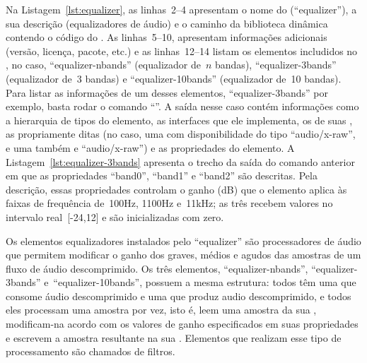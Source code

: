 \documentclass{SBCbookchapter}
\begin{document}


Na Listagem~\ref{lst:equalizer}, as linhas~2--4 apresentam o nome do
 (``equalizer''), a sua descrição (equalizadores de áudio) e o
caminho da biblioteca dinâmica contendo o código do .  As
linhas~5--10, apresentam informações adicionais (versão, licença, pacote,
etc.) e as linhas~12--14 listam os elementos includidos no , no
caso, ``equalizer-nbands'' (equalizador de~$n$ bandas), ``equalizer-3bands''
(equalizador de~3 bandas) e ``equalizer-10bands'' (equalizador de~10
bandas).  Para listar as informações de um desses elementos,
``equalizer-3bands'' por exemplo, basta rodar o comando
``''.  A saída nesse caso contém
informações como a hierarquia de tipos do elemento, as interfaces que ele
implementa, os  de suas , as  propriamente
ditas (no caso, uma  com disponibilidade  do tipo
``audio/x-raw'', e uma  também  e ``audio/x-raw'') e
as propriedades do elemento.  A Listagem~\ref{lst:equalizer-3bands}
apresenta o trecho da saída do comando anterior em que as propriedades
``band0'', ``band1'' e ``band2'' são descritas.  Pela descrição, essas
propriedades controlam o ganho (dB) que o elemento aplica às faixas de
frequência de~100Hz, 1100Hz e~11kHz; as três recebem valores no intervalo
real~[-24,12] e são inicializadas com zero.



Os elementos equalizadores instalados pelo  ``equalizer'' são
processadores de áudio que permitem modificar o ganho dos graves, médios e
agudos das amostras de um fluxo de áudio descomprimido.  Os três elementos,
``equalizer-nbands'', ``equalizer-3bands'' e~``equalizer-10bands'', possuem
a mesma estrutura: todos têm uma  que consome áudio
descomprimido e uma  que produz audio descomprimido, e todos
eles processam uma amostra por vez, isto é, leem uma amostra da sua
, modificam-na acordo com os valores de ganho especificados
em suas propriedades e escrevem a amostra resultante na sua .
Elementos que realizam esse tipo de processamento são chamados de filtros.
\end{document}
